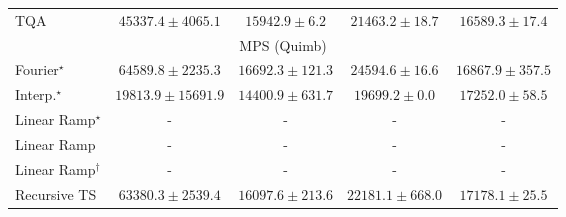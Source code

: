 \begin{tabular}{l|cccc|}
TQA & {\cellcolor[HTML]{8C8CC1}} \color[HTML]{F1F1F1} $45337.4\pm 4065.1$ & {\cellcolor[HTML]{F3F9FB}} \color[HTML]{000000} $15942.9\pm 6.2$ & {\cellcolor[HTML]{E1EDF5}} \color[HTML]{000000} $21463.2\pm 18.7$ & {\cellcolor[HTML]{F1F7FA}} \color[HTML]{000000} $16589.3\pm 17.4$ \\
\cline{1-5}
\multicolumn{5}{c}{\rule{0pt}{8pt}MPS (Quimb)} \\
\midrule
Fourier$^\star$ & {\cellcolor[HTML]{A03704}} \color[HTML]{F1F1F1} $64589.8\pm 2235.3$ & {\cellcolor[HTML]{FFFCD8}} \color[HTML]{000000} $16692.3\pm 121.3$ & {\cellcolor[HTML]{FFEFAC}} \color[HTML]{000000} $24594.6\pm 16.6$ & {\cellcolor[HTML]{FFFCD8}} \color[HTML]{000000} $16867.9\pm 357.5$ \\
Interp.$^\star$ & {\cellcolor[HTML]{FFF9C7}} \color[HTML]{000000} $19813.9\pm 15691.9$ & {\cellcolor[HTML]{FFFFE5}} \color[HTML]{000000} $14400.9\pm 631.7$ & {\cellcolor[HTML]{FFF9C7}} \color[HTML]{000000} $19699.2\pm 0.0$ & {\cellcolor[HTML]{FFFCD6}} \color[HTML]{000000} $17252.0\pm 58.5$ \\
Linear Ramp$^\star$ & {\cellcolor[HTML]{000000}} \color[HTML]{F1F1F1} {\cellcolor{white}} \color{black} - & {\cellcolor[HTML]{000000}} \color[HTML]{F1F1F1} {\cellcolor{white}} \color{black} - & {\cellcolor[HTML]{000000}} \color[HTML]{F1F1F1} {\cellcolor{white}} \color{black} - & {\cellcolor[HTML]{000000}} \color[HTML]{F1F1F1} {\cellcolor{white}} \color{black} - \\
Linear Ramp & {\cellcolor[HTML]{000000}} \color[HTML]{F1F1F1} {\cellcolor{white}} \color{black} - & {\cellcolor[HTML]{000000}} \color[HTML]{F1F1F1} {\cellcolor{white}} \color{black} - & {\cellcolor[HTML]{000000}} \color[HTML]{F1F1F1} {\cellcolor{white}} \color{black} - & {\cellcolor[HTML]{000000}} \color[HTML]{F1F1F1} {\cellcolor{white}} \color{black} - \\
Linear Ramp$^\dagger$ & {\cellcolor[HTML]{000000}} \color[HTML]{F1F1F1} {\cellcolor{white}} \color{black} - & {\cellcolor[HTML]{000000}} \color[HTML]{F1F1F1} {\cellcolor{white}} \color{black} - & {\cellcolor[HTML]{000000}} \color[HTML]{F1F1F1} {\cellcolor{white}} \color{black} - & {\cellcolor[HTML]{000000}} \color[HTML]{F1F1F1} {\cellcolor{white}} \color{black} - \\
Recursive TS & {\cellcolor[HTML]{A93C03}} \color[HTML]{F1F1F1} $63380.3\pm 2539.4$ & {\cellcolor[HTML]{FFFDDC}} \color[HTML]{000000} $16097.6\pm 213.6$ & {\cellcolor[HTML]{FFF6BA}} \color[HTML]{000000} $22181.1\pm 668.0$ & {\cellcolor[HTML]{FFFCD6}} \color[HTML]{000000} $17178.1\pm 25.5$ \\

\end{tabular}
